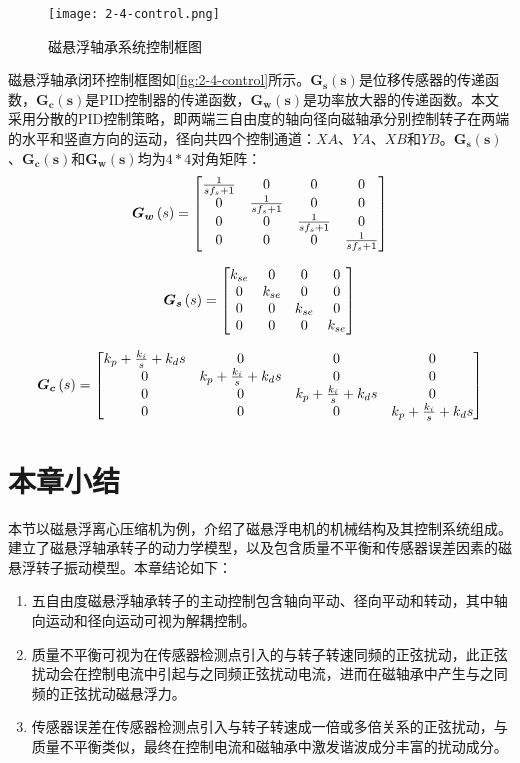 \documentclass[
  lang=cn,
  degree=master,
  openany,oneside
]{nuaathesis}
\begin{document}
\begin{figure}[h!]
	\texttt{[image: 2-4-control.png]}
	\caption{磁悬浮轴承系统控制框图}
	\label{fig:2-4-control}
\end{figure}

磁悬浮轴承闭环控制框图如\autoref{fig:2-4-control}所示。$\boldsymbol{G_s(s)}$是位移传感器的传递函数，$\boldsymbol{G_c(s)}$是PID控制器的传递函数，$\boldsymbol{G_w(s)}$是功率放大器的传递函数。本文采用分散的PID控制策略，即两端三自由度的轴向径向磁轴承分别控制转子在两端的水平和竖直方向的运动，径向共四个控制通道：$XA$、$YA$、$XB$和$YB$。$\boldsymbol{G_s(s)}$、$\boldsymbol{G_c(s)}$和$\boldsymbol{G_w(s)}$均为$4*4$对角矩阵：
$$\boldsymbol{G_w}\left( s \right) = \left[ 
{\begin{matrix}
   {{1 \over {s{f_s} + 1}}} & 0 & 0 & 0  \cr 
   0 & {{1 \over {s{f_s} + 1}}} & 0 & 0  \cr 
   0 & 0 & {{1 \over {s{f_s} + 1}}} & 0  \cr 
   0 & 0 & 0 & {{1 \over {s{f_s} + 1}}}  \cr 

 \end{matrix} }
\right]$$

$$\boldsymbol{G_s}\left( s \right) = \left[ 
{\begin{matrix}
   {{k_{se}}} & 0 & 0 & 0  \cr 
   0 & {{k_{se}}} & 0 & 0  \cr 
   0 & 0 & {{k_{se}}} & 0  \cr 
   0 & 0 & 0 & {{k_{se}}}  \cr 

 \end{matrix} } 
 \right]$$
 
$$\boldsymbol{G_c}\left( s \right) = \left[ {\begin{matrix}
   {{k_p} + {{{k_i}} \over s} + {k_d}s} & 0 & 0 & 0  \cr 
   0 & {{k_p} + {{{k_i}} \over s} + {k_d}s} & 0 & 0  \cr 
   0 & 0 & {{k_p} + {{{k_i}} \over s} + {k_d}s} & 0  \cr 
   0 & 0 & 0 & {{k_p} + {{{k_i}} \over s} + {k_d}s}  \cr 

 \end{matrix} } \right]$$


\section{本章小结}
本节以磁悬浮离心压缩机为例，介绍了磁悬浮电机的机械结构及其控制系统组成。建立了磁悬浮轴承转子的动力学模型，以及包含质量不平衡和传感器误差因素的磁悬浮转子振动模型。本章结论如下：
\begin{enumerate}
\item 五自由度磁悬浮轴承转子的主动控制包含轴向平动、径向平动和转动，其中轴向运动和径向运动可视为解耦控制。
\item 质量不平衡可视为在传感器检测点引入的与转子转速同频的正弦扰动，此正弦扰动会在控制电流中引起与之同频正弦扰动电流，进而在磁轴承中产生与之同频的正弦扰动磁悬浮力。
\item 传感器误差在传感器检测点引入与转子转速成一倍或多倍关系的正弦扰动，与质量不平衡类似，最终在控制电流和磁轴承中激发谐波成分丰富的扰动成分。
\end{enumerate}
\end{document}
